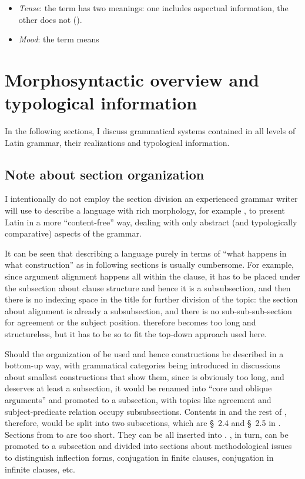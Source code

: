 \documentclass{article}
\newcommand*{\citesec}[1]{\S~{#1}}
\newcommand*{\citechap}[1]{chap.~{#1}}
\begin{document}
\begin{itemize}
    \item \emph{Tense}: the term has two meanings: one includes aspectual information,
    the other does not (). 
    \item \emph{Mood}: the term means 
\end{itemize}

\section{Morphosyntactic overview and typological information}

In the following sections,
I discuss grammatical systems contained in all levels of Latin grammar,
their realizations and typological information.

\subsection{Note about section organization}\label{sec:organization}

I intentionally do not employ the section division 
an experienced grammar writer will use to describe a language with rich morphology,
for example \citet[\citechap{2}]{jacques2021grammar},
to present Latin in a more ``content-free'' way,
dealing with only abstract (and typologically comparative) aspects of the grammar.

It can be seen that describing a language purely in terms of 
``what happens in what construction''
as in following sections
is usually cumbersome.
For example, since argument alignment happens all within the clause,
it has to be placed under the subsection about clause structure
and hence it is a subsubsection,
and then there is no indexing space in the title for further division of the topic:
the section about alignment is already a subsubsection,
and there is no sub-sub-sub-section for agreement or the subject position.
 therefore becomes too long and structureless,
but it has to be so to fit the top-down approach used here.

Should the organization of \citet[\citechap{2}]{jacques2021grammar} be used
and hence constructions be described in a bottom-up way,
with grammatical categories being introduced in discussions about smallest constructions that show them,
since  is obviously too long, and deserves at least a subsection,
it would be renamed into ``core and oblique arguments'' and promoted to a subsection,
with topics like agreement and subject-predicate relation occupy subsubsections.
Contents in  and the rest of ,
therefore, would be split into two subsections, 
which are \citesec{2.4} and \citesec{2.5} in \citet{jacques2021grammar}.
Sections from  to  are too short.
They can be all inserted into .
, in turn, can be 
promoted to a subsection and divided into 
sections about methodological issues to distinguish inflection forms,
conjugation in finite clauses,
conjugation in infinite clauses, etc.
\end{document}
